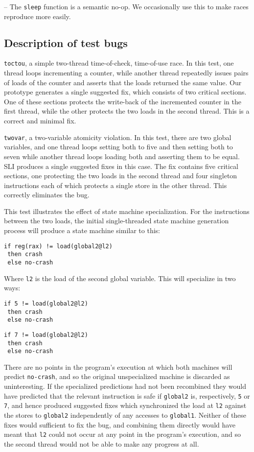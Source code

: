 \documentclass[10pt,twocolumn,preprint,natbib,authoryear]{sigplanconf}
\begin{document}
-- The \verb|sleep| function is a semantic no-op.  We occasionally use
this to make races reproduce more easily.

\subsection{Description of test bugs}
\label{sect:bug_descr}
\verb|toctou|, a simple two-thread time-of-check, time-of-use race.
In this test, one thread loops incrementing a counter, while another
thread repeatedly issues pairs of loads of the counter and asserts
that the loads returned the same value.  Our prototype generates a
single suggested fix, which consists of two critical sections.  One of
these sections protects the write-back of the incremented counter in
the first thread, while the other protects the two loads in the second
thread.  This is a correct and minimal fix.

\verb|twovar|, a two-variable atomicity violation.  In this test,
there are two global variables, and one thread loops setting both to
five and then setting both to seven while another thread loops loading
both and asserting them to be equal.  SLI produces a single suggested
fixes in this case.  The fix contains five critical sections, one
protecting the two loads in the second thread and four singleton
instructions each of which protects a single store in the other
thread.  This correctly eliminates the bug.

This test illustrates the effect of state machine specialization.  For
the instructions between the two loads, the initial single-threaded
state machine generation process will produce a state machine similar
to this:

\begin{verbatim}
if reg(rax) != load(global2@l2)
 then crash
 else no-crash
\end{verbatim}

Where \verb|l2| is the load of the second global variable.  This
will specialize in two ways:

\begin{verbatim}
if 5 != load(global2@l2)
 then crash
 else no-crash
\end{verbatim}

\begin{verbatim}
if 7 != load(global2@l2)
 then crash
 else no-crash
\end{verbatim}

There are no points in the program's execution at which both machines
will predict \verb|no-crash|, and so the original unspecialized
machine is discarded as uninteresting.  If the specialized predictions
had not been recombined they would have predicted that the relevant
instruction is safe if \verb|global2| is, respectively, \verb|5| or
\verb|7|, and hence produced suggested fixes which synchronized the
load at \verb|l2| against the stores to \verb|global2| independently
of any accesses to \verb|global1|.  Neither of these fixes would
sufficient to fix the bug, and combining them directly would have
meant that \verb|l2| could not occur at any point in the program's
execution, and so the second thread would not be able to make any
progress at all.
\end{document}
